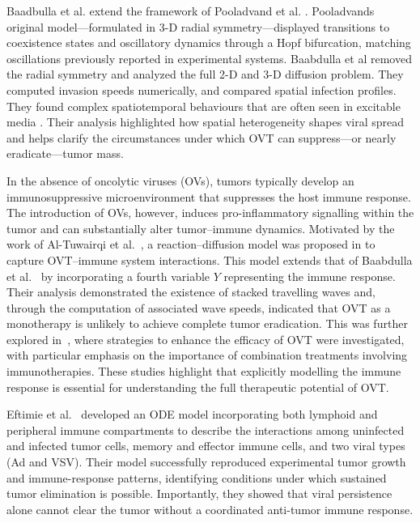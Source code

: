 \documentclass[11pt]{article}
\theoremstyle{definition}
\begin{document}
Baadbulla et al. \cite{arwa} extend the framework of Pooladvand et al. \cite{POOLADVAND2021108520}. Pooladvands original model—formulated in 3-D radial symmetry—displayed transitions to coexistence states and oscillatory dynamics through a Hopf bifurcation, matching oscillations previously reported in experimental systems. Baabdulla et al \cite{arwa} removed the radial symmetry and analyzed the full 2-D and 3-D diffusion problem. They computed invasion speeds numerically, and compared spatial infection profiles. They found  complex spatiotemporal behaviours that are often seen in excitable media \cite{Kuramoto,Sandstede}. Their analysis highlighted how spatial heterogeneity shapes viral spread and helps clarify the circumstances under which OVT can suppress—or nearly eradicate—tumor mass. 

In the absence of oncolytic viruses (OVs), tumors typically develop an immunosuppressive microenvironment that suppresses the host immune response. The introduction of OVs, however, induces pro-inflammatory signalling within the tumor and can substantially alter tumor--immune dynamics. Motivated by the work of Al-Tuwairqi et al.~\cite{alturqwi}, a reaction--diffusion model was proposed in \cite{NegarThomas1} to capture OVT--immune system interactions. This model extends that of Baabdulla et al.~\cite{arwa} by incorporating a fourth variable $Y$ representing the immune response.                                 Their analysis demonstrated the existence of stacked travelling waves and, through the computation of associated wave speeds, indicated that OVT as a monotherapy is unlikely to achieve complete tumor eradication. This was further explored in~\cite{NegarTHomas2}, where strategies to enhance the efficacy of OVT were investigated, with particular emphasis on the importance of combination treatments involving immunotherapies. These studies highlight that explicitly modelling the immune response is essential for understanding the full therapeutic potential of OVT.

Eftimie et al.~\cite{eftimie} developed an ODE model incorporating both lymphoid and peripheral immune compartments to describe the interactions among uninfected and infected tumor cells, memory and effector immune cells, and two viral types (Ad and VSV). Their model successfully reproduced experimental tumor growth and immune-response patterns, identifying conditions under which sustained tumor elimination is possible. Importantly, they showed that viral persistence alone cannot clear the tumor without a coordinated anti-tumor immune response.
\end{document}

